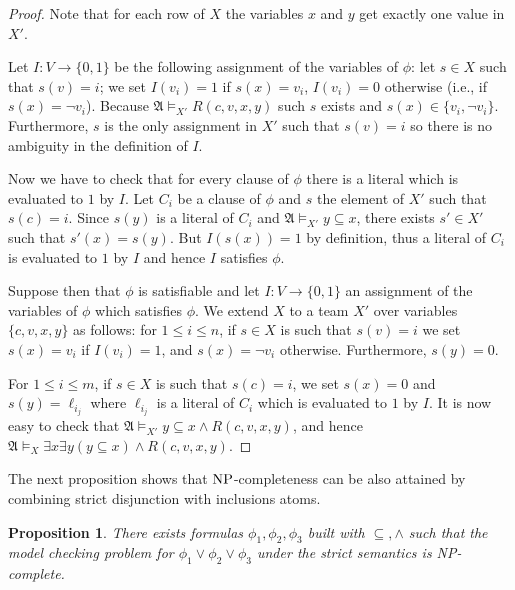 \documentclass{article}
\theoremstyle{plain}
\newtheorem{proposition}[theorem]{Proposition}
\theoremstyle{definition}
\newcommand{\mA}{{\mathfrak A}}
\newcommand{\np}{{\rm NP}}
\begin{document}
\begin{proof}
Note that for each row of $X$ the variables $x$ and $y$ get exactly one value in $X'$.

Let $I: V \rightarrow \{0,1\}$ be the following assignment  of the variables of $\phi$: let $s \in X$  such that $s(v) = i$; we set $I(v_i) = 1$ if $s(x) = v_i$, $I(v_i) = 0$ otherwise (i.e., if $s(x) = \neg v_i$). Because $\mA \models_{X'} R(c,v,x,y)$ such $s$ exists and $s(x) \in \{v_i, \neg v_i\}$. Furthermore, $s$ is the only assignment in $X'$ such that $s(v) = i$ so there is no ambiguity in the definition of $I$.
		
Now we have to check that for every  clause of $\phi$ there is a literal which is evaluated to $1$ by $I$. Let $C_i$ be a clause of $\phi$ and $s$ the element of $X'$ such that $s(c) = i$.  Since $s(y)$ is a literal of $C_i$ and  $\mA \models_{X'} y \subseteq x$, there exists $s' \in X'$ such that $s'(x) = s(y)$. But $I\left(s\left(x\right)\right) = 1$ by definition, thus a literal of $C_i$ is evaluated to $1$ by $I$ and hence $I$ satisfies $\phi$.
	
Suppose then that $\phi$ is satisfiable and let $I: V \rightarrow \{0,1\}$ an assignment of the variables of $\phi$ which satisfies $\phi$. We extend $X$ to a team $X'$ over variables $\{c,v,x,y\}$ as follows: for $1 \leq i \leq n$, if $s \in X$ is such that $s(v) = i$ we set $s(x) = v_i$ if $I(v_i) = 1$, and  $s(x) = \neg v_i$ otherwise. Furthermore, $s(y) = 0$.
		
		For $1 \leq i \leq m$, if $s \in X$ is such that $s(c) = i$, we set $s(x) = 0$ and $s(y) = \ell_{i_j}$ where $\ell_{i_j}$ is a literal of $C_i$ which is evaluated to $1$ by $I$. It is now easy to check that 
		$\mA \models_{X'} y\subseteq x \wedge R(c,v,x,y)$, and hence  $ \mA \models_X \exists x \exists y (y \subseteq x) \wedge R(c,v,x,y)$. 
\end{proof}

The next proposition shows that $\np$-completeness can be also attained by combining strict disjunction with inclusions atoms.
\begin{proposition}\label{StrictInc2}
	There exists formulas $\phi_1,\phi_2,\phi_3$ built with $\subseteq, \wedge$ such that the model checking problem for $\phi_1 \vee \phi_2 \vee \phi_3$ under the strict semantics is NP-complete.
	
\end{proposition}
\end{document}
